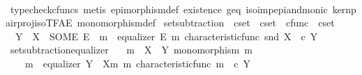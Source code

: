 \begin{isabellebody}
\ \ \ \ \isamarkupfalse%
\ {\isacharparenleft}{\kern0pt}typecheck{\isacharunderscore}{\kern0pt}cfuncs{\isacharcomma}{\kern0pt}\ metis\ epimorphism{\isacharunderscore}{\kern0pt}def{}\ existence\ g{\isacharunderscore}{\kern0pt}eq\ iso{\isacharunderscore}{\kern0pt}imp{\isacharunderscore}{\kern0pt}epi{\isacharunderscore}{\kern0pt}and{\isacharunderscore}{\kern0pt}monic\ kern{\isacharunderscore}{\kern0pt}pair{\isacharunderscore}{\kern0pt}proj{\isacharunderscore}{\kern0pt}iso{\isacharunderscore}{\kern0pt}TFAE{}\ monomorphism{\isacharunderscore}{\kern0pt}def{}{\isacharparenright}{\kern0pt}\isanewline
{}\isamarkupfalse%
%
\endisatagproof
{\isafoldproof}%
%
\isadelimproof
%
\endisadelimproof
%
\isadelimdocument
%
\endisadelimdocument
%
\isatagdocument
%
\isamarkuptrue%
%
\endisatagdocument
{\isafolddocument}%
%
\isadelimdocument
%
\endisadelimdocument
{}\isamarkupfalse%
\ set{\isacharunderscore}{\kern0pt}subtraction\ {\isacharcolon}{\kern0pt}{\isacharcolon}{\kern0pt}\ {\isachardoublequoteopen}cset\ {\isasymRightarrow}\ cset\ {\isasymtimes}\ cfunc\ {\isasymRightarrow}\ cset{\isachardoublequoteclose}\ {\isacharparenleft}{\kern0pt}\ {\isachardoublequoteopen}{\isasymsetminus}{\isachardoublequoteclose}\ {}{}{\isacharparenright}{\kern0pt}\ \isanewline
\ \ {\isachardoublequoteopen}Y\ {\isasymsetminus}\ X\ {\isacharequal}{\kern0pt}\ {\isacharparenleft}{\kern0pt}SOME\ E{\isachardot}{\kern0pt}\ {\isasymexists}\ m{\isacharprime}{\kern0pt}{\isachardot}{\kern0pt}\ \ equalizer\ E\ m{\isacharprime}{\kern0pt}\ {\isacharparenleft}{\kern0pt}characteristic{\isacharunderscore}{\kern0pt}func\ {\isacharparenleft}{\kern0pt}snd\ X{\isacharparenright}{\kern0pt}{\isacharparenright}{\kern0pt}\ {\isacharparenleft}{\kern0pt}{\isasymf}\ {\isasymcirc}\isactrlsub c\ {\isasymbeta}\isactrlbsub Y\isactrlesub {\isacharparenright}{\kern0pt}{\isacharparenright}{\kern0pt}{\isachardoublequoteclose}\isanewline
\isanewline
{}\isamarkupfalse%
\ set{\isacharunderscore}{\kern0pt}subtraction{\isacharunderscore}{\kern0pt}equalizer{\isacharcolon}{\kern0pt}\isanewline
\ \ \ {\isachardoublequoteopen}m\ {\isacharcolon}{\kern0pt}\ X\ {\isasymrightarrow}\ Y{\isachardoublequoteclose}\ {\isachardoublequoteopen}monomorphism\ m{\isachardoublequoteclose}\isanewline
\ \ \ {\isachardoublequoteopen}{\isasymexists}\ m{\isacharprime}{\kern0pt}{\isachardot}{\kern0pt}\ \ equalizer\ {\isacharparenleft}{\kern0pt}Y\ {\isasymsetminus}\ {\isacharparenleft}{\kern0pt}X{\isacharcomma}{\kern0pt}m{\isacharparenright}{\kern0pt}{\isacharparenright}{\kern0pt}\ m{\isacharprime}{\kern0pt}\ {\isacharparenleft}{\kern0pt}characteristic{\isacharunderscore}{\kern0pt}func\ m{\isacharparenright}{\kern0pt}\ {\isacharparenleft}{\kern0pt}{\isasymf}\ {\isasymcirc}\isactrlsub c\ {\isasymbeta}\isactrlbsub Y\isactrlesub {\isacharparenright}{\kern0pt}{\isachardoublequoteclose}\isanewline

\end{isabellebody}
